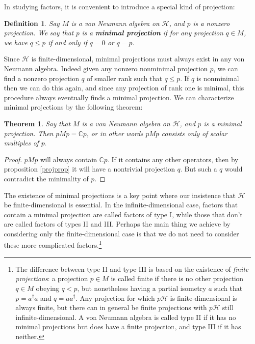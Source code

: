 \documentclass[12pt]{article}
\newcommand{\Hh}{\mathcal{H}}
\newtheorem{mydef}{Definition}[section]
\newtheorem{thm}{Theorem}[section]
\begin{document}
In studying factors, it is convenient to introduce a special kind of projection:
\begin{mydef}
Say $M$ is a von Neumann algebra on $\Hh$, and $p$ is a nonzero projection.  We say that $p$ is a \textbf{minimal projection} if for any projection $q\in M$, we have $q\leq p$ if and only if $q=0$ or $q=p$.  
\end{mydef}
Since $\Hh$ is finite-dimensional, minimal projections must always exist in any von Neumann algebra. Indeed given any nonzero nonminimal projection $p$, we can find a nonzero projection $q$ of smaller rank such that $q\leq p$.  If $q$ is nonminimal then we can do this again, and since any projection of rank one is minimal, this procedure always eventually finds a minimal projection.  We can characterize minimal projections by the following theorem:  
\begin{thm}\label{minprojthm}
Say that $M$ is a von Neumann algebra on $\Hh$, and $p$ is a minimal projection.  Then $pMp=\mathbb{C}p$, or in other words $pMp$ consists only of scalar multiples of $p$.  
\end{thm}
\begin{proof}
$pMp$ will always contain $\mathbb{C}p$.  If it contains any other operators, then by proposition \eqref{projprop} it will have a nontrivial projection $q$.  But such a $q$ would contradict the minimality of $p$.
\end{proof}
The existence of minimal projections is a key point where our insistence that $\Hh$ be finite-dimensional is essential.  In the infinite-dimensional case, factors that contain a minimal projection are called factors of type I, while those that don't are called factors of types II and III.  Perhaps the main thing we achieve by considering only the finite-dimensional case is that we do not need to consider these more complicated factors.\footnote{The difference between type II and type III is based on the existence of \textit{finite projections}: a projection $p\in M$ is called finite if there is no other projection $q\in M$ obeying $q<p$, but nonetheless having a partial isometry $a$ such that $p=a^\dagger a$ and $q=aa^\dagger$.  Any projection for which $p\Hh$ is finite-dimensional is always finite, but there can in general be finite projections with $p\Hh$ still infinite-dimensional.  A von Neumann algebra is called type II if it has no minimal projections but does have a finite projection, and type III if it has neither.}
 
\end{document}
